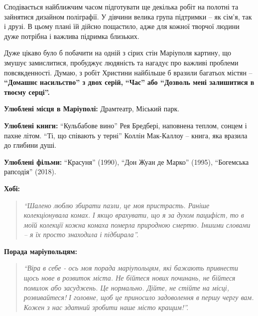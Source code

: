 Сподівається найближчим часом підготувати ще декілька робіт на полотні та
зайнятися дизайном поліграфії. У дівчини велика група підтримки – як сім'я, так
і друзі. В цьому плані їй дійсно пощастило, адже для кожної творчої людини дуже
потрібна і важлива підримка близьких. 


Дуже цікаво було б побачити на одній з сірих стін Маріуполя картину, що змушує
замислитися, пробуджує людяність та нагадує про важливі проблеми
повсякденності. Думаю, з робіт Христини найбільше б вразили багатьох містян –
\textbf{\enquote{Домашнє насильство} з двох серій,} \textbf{\enquote{Час}} \textbf{або \enquote{Дозволь мені залишитися в твоєму
серці}.}

\textbf{Улюблені місця в Маріуполі:} Драмтеатр, Міський парк.

\textbf{Улюблені книги:} \enquote{Кульбабове вино} Рея Бредбері, наповнена теплом, сонцем і
пахне літом. \enquote{Ті, що співають у терні} Коллін Мак-Каллоу – книга, яка вразила
до глибини душі.

\textbf{Улюблені фільми:} \enquote{Красуня} (1990), \enquote{Дон Жуан де Марко} (1995), \enquote{Богемська
рапсодія} (2018).

\textbf{Хобі:} 

\begin{quote}
\em\enquote{Шалено люблю збирати пазли, це моя пристрасть. Раніше колекціонувала
комах. І якщо врахувати, що я за духом пацифіст, то в моїй колекції кожна
комаха померла природною смертю. Іншими словами – я їх просто знаходила і
підбирала}.
\end{quote}

\textbf{Порада маріупольцям:} 

\begin{quote}
\em\enquote{Віра в себе - ось моя порада маріупольцям, які бажають
привнести щось нове в розвиток міста. Не бійтеся нових починань, не бійтеся
помилок або засуджень. Це нормально. Дійте, не стійте на місці, розвивайтеся! І
головне, щоб це приносило задоволення в першу чергу вам. Кожен з нас здатний
зробити наше місто кращим!}.
\end{quote}
